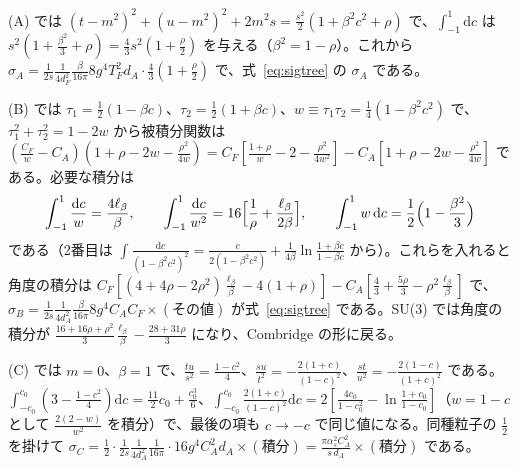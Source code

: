 \documentclass[a4paper,10pt]{ltjsarticle}
\newcommand{\dd}{\mathrm{d}}
\begin{document}
(A) では $(t-m^2)^2+(u-m^2)^2+2m^2s=\frac{s^2}2(1+\beta^2c^2+\rho)$ で、$\int_{-1}^1\dd c$ は $s^2(1+\frac{\beta^2}3+\rho)=\frac43s^2(1+\frac\rho2)$ を与える（$\beta^2=1-\rho$）。これから $\sigma_A=\frac{1}{2s}\frac{1}{4d_F^2}\frac{\beta}{16\pi}8g^4T_F^2d_A\cdot\frac43(1+\frac\rho2)$ で、式~\eqref{eq:sigtree} の $\sigma_A$ である。

(B) では $\tau_1=\frac12(1-\beta c)$、$\tau_2=\frac12(1+\beta c)$、$w\equiv\tau_1\tau_2=\frac14(1-\beta^2c^2)$ で、$\tau_1^2+\tau_2^2=1-2w$ から被積分関数は $(\frac{C_F}w-C_A)(1+\rho-2w-\frac{\rho^2}{4w})=C_F[\frac{1+\rho}w-2-\frac{\rho^2}{4w^2}]-C_A[1+\rho-2w-\frac{\rho^2}{4w}]$ である。必要な積分は
\begin{equation*}
\int_{-1}^1\frac{\dd c}{w}=\frac{4\ell_\beta}{\beta},\qquad
\int_{-1}^1\frac{\dd c}{w^2}=16\Bigl[\frac1\rho+\frac{\ell_\beta}{2\beta}\Bigr],\qquad
\int_{-1}^1w\,\dd c=\frac12\Bigl(1-\frac{\beta^2}3\Bigr)
\end{equation*}
である（2番目は $\int\frac{\dd c}{(1-\beta^2c^2)^2}=\frac{c}{2(1-\beta^2c^2)}+\frac{1}{4\beta}\ln\frac{1+\beta c}{1-\beta c}$ から）。これらを入れると角度の積分は $C_F[(4+4\rho-2\rho^2)\frac{\ell_\beta}\beta-4(1+\rho)]-C_A[\frac43+\frac{5\rho}3-\rho^2\frac{\ell_\beta}\beta]$ で、$\sigma_B=\frac{1}{2s}\frac{1}{4d_A^2}\frac{\beta}{16\pi}8g^4C_AC_F\times(\text{その値})$ が式~\eqref{eq:sigtree} である。SU(3) では角度の積分が $\frac{16+16\rho+\rho^2}3\frac{\ell_\beta}\beta-\frac{28+31\rho}3$ になり、Combridge の形に戻る。

(C) では $m=0$、$\beta=1$ で、$\frac{tu}{s^2}=\frac{1-c^2}4$、$\frac{su}{t^2}=-\frac{2(1+c)}{(1-c)^2}$、$\frac{st}{u^2}=-\frac{2(1-c)}{(1+c)^2}$ である。$\int_{-c_0}^{c_0}(3-\frac{1-c^2}4)\dd c=\frac{11}2c_0+\frac{c_0^3}6$、$\int_{-c_0}^{c_0}\frac{2(1+c)}{(1-c)^2}\dd c=2[\frac{4c_0}{1-c_0^2}-\ln\frac{1+c_0}{1-c_0}]$（$w=1-c$ として $\frac{2(2-w)}{w^2}$ を積分）で、最後の項も $c\to-c$ で同じ値になる。同種粒子の $\frac12$ を掛けて $\sigma_C=\frac12\cdot\frac{1}{2s}\frac{1}{4d_A^2}\frac{1}{16\pi}\cdot16g^4C_A^2d_A\times(\text{積分})=\frac{\pi\alpha_s^2C_A^2}{s\,d_A}\times(\text{積分})$ である。
\end{document}
